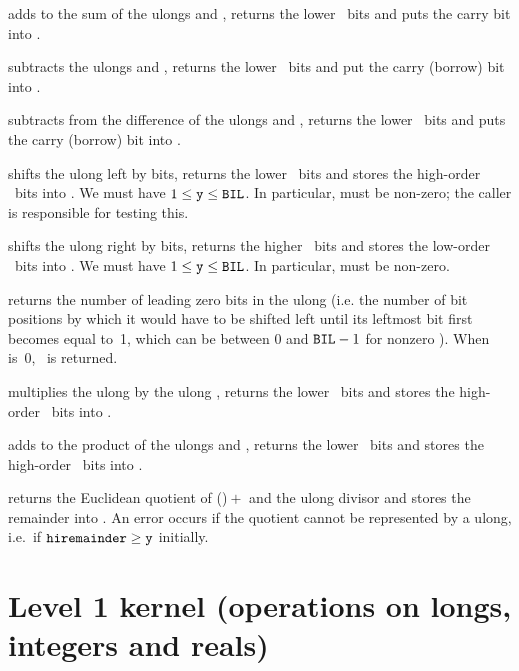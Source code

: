  adds  to the sum of the
ulongs  and , returns the lower \B\ bits and puts the
carry bit into .

 subtracts the ulongs  and ,
returns the lower \B\ bits and put the carry (borrow) bit into .

 subtracts  from the
difference of the ulongs  and , returns the lower \B\ bits
and puts the carry (borrow) bit into .

 shifts the ulong  left by 
bits, returns the lower \B\ bits and stores the high-order \B\ bits into
. We must have $1\le{\tt y}\le{\tt BIL}$. In particular, 
must be non-zero; the caller is responsible for testing this.

 shifts the ulong  right
by  bits, returns the higher \B\ bits and stores the low-order
\B\ bits into . We must have $1\le{\tt y}\le{\tt BIL}$. In
particular,  must be non-zero.

 returns the number of leading zero bits in the
ulong  (i.e. the number of bit positions by which it would have to be
shifted left until its leftmost bit first becomes equal to~1, which can be
between 0 and ${\tt BIL}-1$ for nonzero ). When  is~0, \B\ is returned.

 multiplies the ulong  by the ulong
, returns the lower \B\ bits and stores the high-order \B\ bits into
.

 adds  to the product
of the ulongs  and , returns the lower \B\ bits and stores the
high-order \B\ bits into .

 returns the Euclidean quotient of
()${}+{}$ and the ulong divisor  and
stores the remainder into . An error occurs if the quotient
cannot be represented by a ulong, i.e.~if ${\tt hiremainder}\ge{\tt y}$
initially.

\section{Level 1 kernel (operations on longs, integers and reals)}

